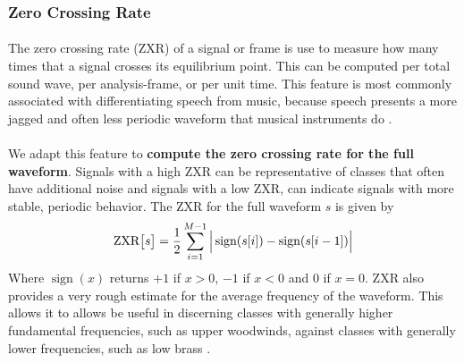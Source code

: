 \documentclass[12pt,letterpaper]{article}
\DeclareMathOperator{\sign}{\text{sign}}
\begin{document}

\subsubsection{Zero Crossing Rate}

\paragraph*{}The zero crossing rate (ZXR) of a signal or frame is use to measure how many times that a signal crosses its equilibrium point. This can be computed per total sound wave, per analysis-frame, or per unit time. This feature is most commonly associated with differentiating speech from music, because speech presents a more jagged and often less periodic waveform that musical instruments do \cite{Khan,Liu,Zhang} . 

\paragraph*{}We adapt this feature to \textbf{compute the zero crossing rate for the full waveform}. Signals with a high ZXR can be representative of classes that often have additional noise and signals with a low ZXR, can indicate signals with more stable, periodic behavior. The ZXR for the full waveform $s$ is given by \cite{Serizel,Liu}
\begin{equation}
\label{eqn-ZXR}
\text{ZXR}\big[ s \big] = \frac{1}{2} \sum_{i=1}^{M-1} \Big{|} \sign(s[i]) - \sign(s[i-1]) \Big{|} 
\end{equation}
Where $\sign(x)$ returns $+1$ if $x > 0$, $-1$ if $x < 0$ and $0$ if $x = 0$. ZXR also provides a very rough estimate for the average frequency of the waveform. This allows it to allows be useful in discerning classes with generally higher fundamental frequencies, such as upper woodwinds, against classes with generally lower frequencies, such as low brass \cite{Liu,White}.
\end{document}
